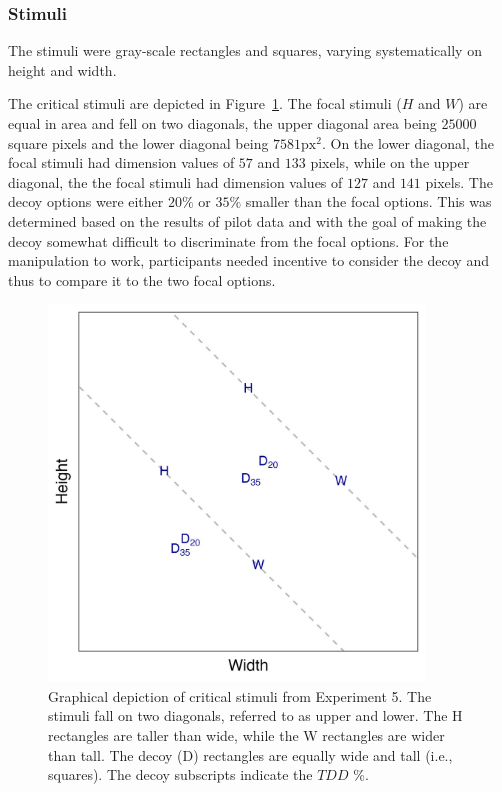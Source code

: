 \subsubsection{Stimuli}
The stimuli were gray-scale rectangles and squares, varying systematically on height and width. 

The critical stimuli are depicted in Figure~\ref{fig:comparability_stim_plot}. The focal stimuli ($H$ and $W$) are equal in area and fell on two diagonals, the upper diagonal area being $25000$ square pixels and the lower diagonal being $7581\text{px}^2$. On the lower diagonal, the focal stimuli had dimension values of $57$ and $133$ pixels, while on the upper diagonal, the the focal stimuli had dimension values of $127$ and $141$ pixels. 
The decoy options were either $20\%$ or $35\%$ smaller than the focal options. This was determined based on the results of pilot data and with the goal of making the decoy somewhat difficult to discriminate from the focal options. For the manipulation to work, participants needed incentive to consider the decoy and thus to compare it to the two focal options. 

\begin{figure}
   \includegraphics[width=100mm]{figures/comparability_stim.jpg}
   \caption{Graphical depiction of critical stimuli from Experiment 5. The stimuli fall on two diagonals, referred to as upper and lower. The H rectangles are taller than wide, while the W rectangles are wider than tall. The decoy (D) rectangles are equally wide and tall (i.e., squares). The decoy subscripts indicate the $TDD$ $\%$.}
   \label{fig:comparability_stim_plot}
\end{figure}

